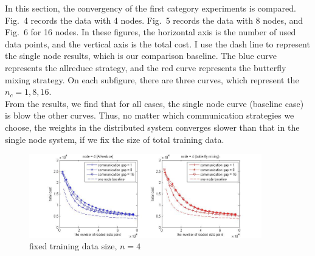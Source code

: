 \documentclass{article}
\begin{document}
In this section, the convergency of the first category experiments is compared. Fig.~4 records the data with 4 nodes. Fig.~5 records the data with 8 nodes, and Fig.~6 for 16 nodes. In these figures, the horizontal axis is the number of used data points, and the vertical axis is the total cost. I use the dash line to represent the single node results, which is our comparison baseline. The blue curve represents the allreduce strategy, and the red curve represents the butterfly mixing strategy. On each subfigure, there are three curves, which represent the $n_c = 1 , 8 , 16$. \\

From the results, we find that for all cases, the single node curve (baseline case) is blow the other curves. Thus, no matter which communication strategies we choose, the weights in the distributed system converges slower than that in the single node system, if we fix the size of total training data. 

\begin{center}
\begin{figure}
  
  \centering
    \includegraphics[width=0.9\textwidth]{batch20_node4_fixData.jpg}
    \caption{fixed training data size, $n=4$}

\end{figure}
\end{center}
\end{document}
